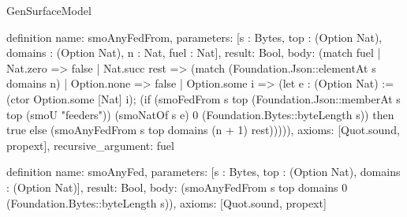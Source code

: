 \begin{lexlean}{GenSurfaceModel}
\begin{semanticmodule}
definition{
  name: smoAnyFedFrom,
  parameters: [s : Bytes, top : (Option Nat), domains : (Option Nat), n : Nat, fuel : Nat],
  result: Bool,
  body: (match fuel
    | Nat.zero => false
    | Nat.succ rest => (match (Foundation.Json::elementAt s domains n)
      | Option.none => false
      | Option.some i => (let e : (Option Nat) := (ctor Option.some [Nat] i); (if (smoFedFrom s top (Foundation.Json::memberAt s top (smoU "feeders")) (smoNatOf s e) 0 (Foundation.Bytes::byteLength s)) then true else (smoAnyFedFrom s top domains (n + 1) rest))))),
  axioms: [Quot.sound, propext],
  recursive_argument: fuel
}

definition{
  name: smoAnyFed,
  parameters: [s : Bytes, top : (Option Nat), domains : (Option Nat)],
  result: Bool,
  body: (smoAnyFedFrom s top domains 0 (Foundation.Bytes::byteLength s)),
  axioms: [Quot.sound, propext]
}


\end{semanticmodule}
\end{lexlean}
